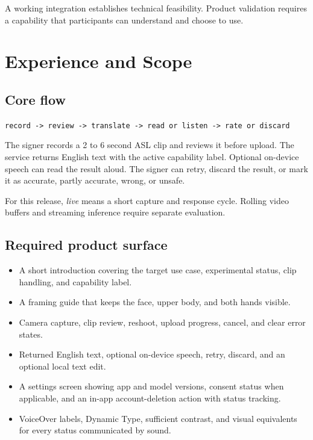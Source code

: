 \documentclass[11pt]{article}
\newcommand{\code}[1]{\texttt{#1}}
\begin{document}
A working integration establishes technical feasibility. Product validation requires
a capability that participants can understand and choose to use.

\section{Experience and Scope}

\subsection{Core flow}

\begin{center}
\code{record -> review -> translate -> read or listen -> rate or discard}
\end{center}

The signer records a 2 to 6 second ASL clip and reviews it before upload.
The service returns English text with the active capability label. Optional on-device
speech can read the result aloud. The signer can retry, discard the result, or mark it
as accurate, partly accurate, wrong, or unsafe.

For this release, \emph{live} means a short capture and response cycle. Rolling video
buffers and streaming inference require separate evaluation.

\subsection{Required product surface}

\begin{itemize}[nosep]
  \item A short introduction covering the target use case, experimental status, clip
        handling, and capability label.
  \item A framing guide that keeps the face, upper body, and both hands visible.
  \item Camera capture, clip review, reshoot, upload progress, cancel, and clear error
        states.
  \item Returned English text, optional on-device speech, retry, discard, and an
        optional local text edit.
  \item A settings screen showing app and model versions, consent status when
        applicable, and an in-app account-deletion action with status tracking.
  \item VoiceOver labels, Dynamic Type, sufficient contrast, and visual equivalents
        for every status communicated by sound.
\end{itemize}
\end{document}

